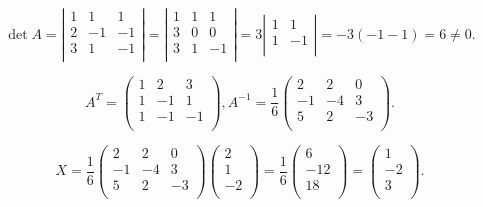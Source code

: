 $$\det A = \left| \begin{matrix}
	1 & 1  & 1  \\
	2 & -1 & -1 \\
	3 & 1  & -1 \\
\end{matrix} \right|
= \left| \begin{matrix}
	1 & 1  & 1  \\
	3 & 0  & 0  \\
	3 & 1  & -1 \\
\end{matrix} \right|
= 3 \left| \begin{matrix}
	1 &  1 \\
	1 & -1 \\
\end{matrix} \right|
= -3 (-1 -1) = 6 \neq 0.$$

$$A^T = \begin{pmatrix}
	1 & 2  & 3  \\
	1 & -1 & 1  \\
	1 & -1 & -1 \\
\end{pmatrix}, A^{-1} = \dfrac{1}{6} \begin{pmatrix}
	2  & 2  & 0  \\
	-1 & -4 & 3  \\
	5  & 2  & -3 \\
\end{pmatrix}.$$

$$X = \dfrac{1}{6} \begin{pmatrix}
	2  & 2  & 0  \\
	-1 & -4 & 3  \\
	5  & 2  & -3 \\
\end{pmatrix} \begin{pmatrix}
	 2 \\
	 1 \\
	-2 \\
\end{pmatrix} 
= \dfrac{1}{6} \begin{pmatrix}
	 6  \\
	-12 \\
	 18  \\
\end{pmatrix}
= \begin{pmatrix}
	 1  \\
	-2 \\
	 3  \\
\end{pmatrix}.$$

